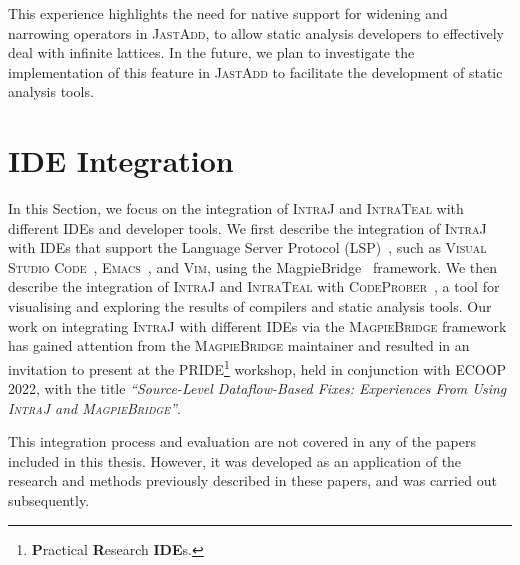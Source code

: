 This experience highlights the need for native support for widening and narrowing
operators in \textsc{JastAdd}, to allow static analysis developers to effectively deal with
infinite lattices. In the future, we plan to investigate the implementation of this
feature in \textsc{JastAdd} to facilitate the development of static analysis tools.


\section{IDE Integration}
\label{sec:IDEIntegration}
In this Section, we focus on the integration of \textsc{IntraJ} and \textsc{IntraTeal} with different
IDEs and developer tools. We first describe the integration of \textsc{IntraJ} with
IDEs that support the Language Server Protocol (LSP)~\cite{lsp}, such as
\textsc{Visual Studio Code}~\cite{vscode}, \textsc{Emacs}~\cite{emacs}, and \textsc{Vim}\cite{vim}, using
the MagpieBridge~\cite{luo_et_al:LIPIcs:2019:10813} framework. We then describe the
integration of \textsc{IntraJ} and \textsc{IntraTeal} with \textsc{CodeProber}~\cite{risberg2022property},
a tool for visualising and exploring the results of compilers and static analysis tools.
Our work on integrating \textsc{IntraJ} with different IDEs via the \textsc{MagpieBridge}
framework has gained attention from the \textsc{MagpieBridge} maintainer and resulted in an invitation
to present at the \textsc{PRIDE}\footnote{\textbf{P}ractical \textbf{R}esearch \textbf{IDE}s.} workshop, held in conjunction with \textsc{ECOOP 2022}, with the
title \emph{``Source-Level Dataflow-Based Fixes: Experiences From Using \textsc{IntraJ} and \textsc{MagpieBridge}''}.

This integration process and evaluation are not covered in any of the papers included in this thesis.
However, it was developed as an application of the research and methods previously
described in these papers, and was carried out subsequently.

